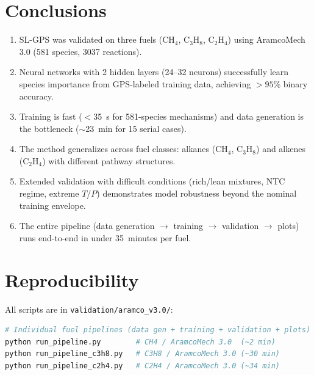 \documentclass[11pt,a4paper]{article}
\begin{document}
\section{Conclusions}
\label{sec:conclusions}

\begin{enumerate}
    \item SL-GPS was validated on three fuels (CH$_4$, C$_3$H$_8$, C$_2$H$_4$) using AramcoMech 3.0 (581 species, 3037 reactions).
    \item Neural networks with 2 hidden layers (24--32 neurons) successfully learn species importance from GPS-labeled training data, achieving $>95\%$ binary accuracy.
    \item Training is fast ($<$35~s for 581-species mechanisms) and data generation is the bottleneck ($\sim$23~min for 15 serial cases).
    \item The method generalizes across fuel classes: alkanes (CH$_4$, C$_3$H$_8$) and alkenes (C$_2$H$_4$) with different pathway structures.
    \item Extended validation with difficult conditions (rich/lean mixtures, NTC regime, extreme $T$/$P$) demonstrates model robustness beyond the nominal training envelope.
    \item The entire pipeline (data generation $\rightarrow$ training $\rightarrow$ validation $\rightarrow$ plots) runs end-to-end in under 35~minutes per fuel.
\end{enumerate}

\section{Reproducibility}
\label{sec:reproducibility}

All scripts are in \texttt{validation/aramco\_v3.0/}:

\begin{lstlisting}[language=bash]
# Individual fuel pipelines (data gen + training + validation + plots)
python run_pipeline.py        # CH4 / AramcoMech 3.0  (~2 min)
python run_pipeline_c3h8.py   # C3H8 / AramcoMech 3.0 (~30 min)
python run_pipeline_c2h4.py   # C2H4 / AramcoMech 3.0 (~34 min)
\end{lstlisting}
\end{document}
